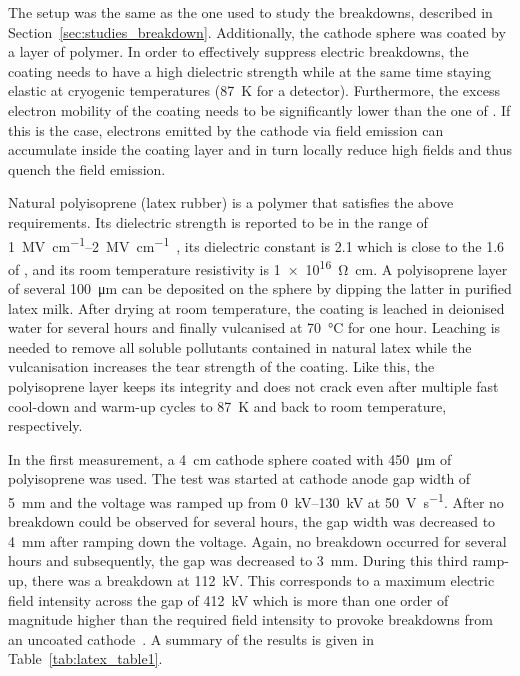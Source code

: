 The setup was the same as the one used to study the breakdowns, described in Section~\ref{sec:studies_breakdown}.
Additionally, the cathode sphere was coated by a layer of polymer.
In order to effectively suppress electric breakdowns, the coating needs to have a high dielectric strength while at the same time staying elastic at cryogenic temperatures (\SI{87}{\kelvin} for a \lar{} detector).
Furthermore, the excess electron mobility of the coating needs to be significantly lower than the one of \lar{}.
If this is the case, electrons emitted by the cathode via field emission can accumulate inside the coating layer and in turn locally reduce high fields and thus quench the field emission.

Natural polyisoprene (latex rubber) is a polymer that satisfies the above requirements.
Its dielectric strength is reported to be in the range of \SIrange{1}{2}{\mega\volt\per\centi\metre}~\cite{fizikaDielektrikov}, its dielectric constant is \num{2.1} which is close to the \num{1.6} of \lar{}, and its room temperature resistivity is \SI{1e16}{\ohm\centi\metre}.
A polyisoprene layer of several \SI{100}{\micro\metre} can be deposited on the sphere by dipping the latter in purified latex milk.
After drying at room temperature, the coating is leached in deionised water for several hours and finally vulcanised at \SI{70}{\celsius} for one hour.
Leaching is needed to remove all soluble pollutants contained in natural latex while the vulcanisation increases the tear strength of the coating.
Like this, the polyisoprene layer keeps its integrity and does not crack even after multiple fast cool-down and warm-up cycles to \SI{87}{\kelvin} and back to room temperature, respectively.

In the first measurement, a \SI{4}{\centi\metre} cathode sphere coated with \SI{450}{\micro\metre} of polyisoprene was used.
The test was started at cathode anode gap width of \SI{5}{\milli\metre} and the voltage was ramped up from \SIrange{0}{130}{\kilo\volt} at \SI{50}{\volt\per\second}.
After no breakdown could be observed for several hours, the gap width was decreased to \SI{4}{\milli\metre} after ramping down the voltage.
Again, no breakdown occurred for several hours and subsequently, the gap was decreased to \SI{3}{\milli\metre}.
During this third ramp-up, there was a breakdown at \SI{112}{\kilo\volt}.
This corresponds to a maximum electric field intensity across the gap of \SI{412}{\kilo\volt} which is more than one order of magnitude higher than the required field intensity to provoke breakdowns from an uncoated cathode~\cite{breakdown_14, breakdown_16}.
A summary of the results is given in Table~\ref{tab:latex_table1}.

